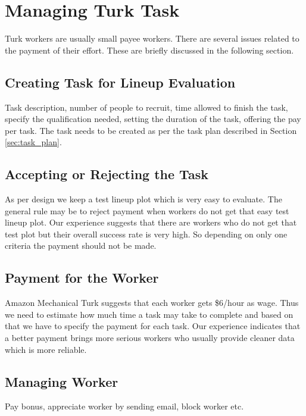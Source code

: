 \documentclass[11pt]{article}
\begin{document}
\section{Managing Turk Task}\label{sec:turk_task}  

Turk workers are usually small payee workers. There are several issues related to the payment of their effort. These are briefly discussed in the following section. 


\subsection{Creating Task for Lineup Evaluation} Task description, number of people to recruit, time allowed to finish the task, specify the qualification needed, setting the duration of the task, offering the pay per task. The task needs to be created as per the task plan described in Section \ref{sec:task_plan}.

\subsection{Accepting or Rejecting the Task} As per design we keep a test lineup plot which is very easy to evaluate. The general rule may be to reject payment when workers do not get that easy test lineup plot. Our experience suggests that there are workers who do not get that test plot but their overall success rate is very high. So depending on only one criteria the payment should not be made. 


\subsection{Payment for the Worker}Amazon Mechanical Turk suggests that each worker gets \$6/hour as wage. Thus we need to estimate how much time a task may take to complete and based on that we have to specify the payment for each task. Our experience indicates that a better payment brings more serious workers who usually provide cleaner data which is more reliable. 


\subsection{Managing Worker} Pay bonus, appreciate worker by sending email, block worker etc.
\end{document}
